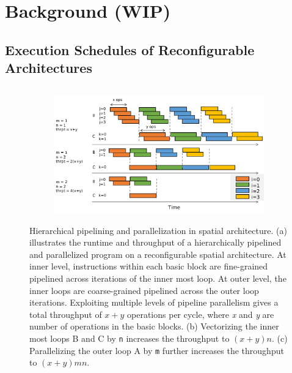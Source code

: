 \chapter{Background (WIP)}

\section{Execution Schedules of Reconfigurable Architectures} 
\begin{figure}
\begin{subfigure}[b]{0.34\textwidth}
\inputminted{python}{code/spatialeg2.py}
\caption {
}
\end{subfigure}
\hfill
\begin{subfigure}[b]{0.65\textwidth}
\centering
\includegraphics[width=1.0\textwidth]{figs/pipeexec.pdf}
\caption {
}
\end{subfigure}
\caption[Hiearchical pipelining and parallelization on spatial architecture]{
Hierarchical pipelining and parallelization in spatial architecture.
(a) illustrates the runtime and throughput of a hierarchically pipelined and parallelized program on
a reconfigurable spatial architecture. 
At inner level, instructions within each basic
block are fine-grained pipelined across iterations of the inner most loop. 
At outer level, the inner loops are coarse-grained pipelined across the outer loop iterations.
Exploiting multiple levels of pipeline parallelism gives a total throughput of $x+y$ operations per
  cycle, where \emph{x} and \emph{y} are number of operations in the basic blocks.
(b) Vectorizing the inner most loops B and C by \texttt{n} increases the throughput to $(x+y)n$.
(c) Parallelizing the outer loop A by \texttt{m} further increases the throughput to $(x+y)mn$.
}
\label{fig:pipeexec}
\end{figure}

